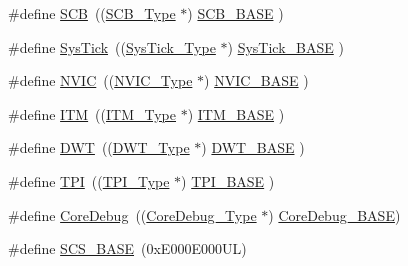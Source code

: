 \begin{DoxyCompactItemize}
\item 
\#define \mbox{\hyperlink{group___c_m_s_i_s__core__base_gaaaf6477c2bde2f00f99e3c2fd1060b01}{S\+CB}}~((\mbox{\hyperlink{struct_s_c_b___type}{S\+C\+B\+\_\+\+Type}}       $\ast$)     \mbox{\hyperlink{group___c_m_s_i_s__core__base_gad55a7ddb8d4b2398b0c1cfec76c0d9fd}{S\+C\+B\+\_\+\+B\+A\+SE}}      )
\item 
\#define \mbox{\hyperlink{group___c_m_s_i_s__core__base_gacd96c53beeaff8f603fcda425eb295de}{Sys\+Tick}}~((\mbox{\hyperlink{struct_sys_tick___type}{Sys\+Tick\+\_\+\+Type}}   $\ast$)     \mbox{\hyperlink{group___c_m_s_i_s__core__base_ga58effaac0b93006b756d33209e814646}{Sys\+Tick\+\_\+\+B\+A\+SE}}  )
\item 
\#define \mbox{\hyperlink{group___c_m_s_i_s__core__base_gac8e97e8ce56ae9f57da1363a937f8a17}{N\+V\+IC}}~((\mbox{\hyperlink{struct_n_v_i_c___type}{N\+V\+I\+C\+\_\+\+Type}}      $\ast$)     \mbox{\hyperlink{group___c_m_s_i_s__core__base_gaa0288691785a5f868238e0468b39523d}{N\+V\+I\+C\+\_\+\+B\+A\+SE}}     )
\item 
\#define \mbox{\hyperlink{group___c_m_s_i_s__core__base_gabae7cdf882def602cb787bb039ff6a43}{I\+TM}}~((\mbox{\hyperlink{struct_i_t_m___type}{I\+T\+M\+\_\+\+Type}}       $\ast$)     \mbox{\hyperlink{group___c_m_s_i_s__core__base_gadd76251e412a195ec0a8f47227a8359e}{I\+T\+M\+\_\+\+B\+A\+SE}}      )
\item 
\#define \mbox{\hyperlink{group___c_m_s_i_s__core__base_gabbe5a060185e1d5afa3f85b14e10a6ce}{D\+WT}}~((\mbox{\hyperlink{struct_d_w_t___type}{D\+W\+T\+\_\+\+Type}}       $\ast$)     \mbox{\hyperlink{group___c_m_s_i_s__core__base_gafdab534f961bf8935eb456cb7700dcd2}{D\+W\+T\+\_\+\+B\+A\+SE}}      )
\item 
\#define \mbox{\hyperlink{group___c_m_s_i_s__core__base_ga8b4dd00016aed25a0ea54e9a9acd1239}{T\+PI}}~((\mbox{\hyperlink{struct_t_p_i___type}{T\+P\+I\+\_\+\+Type}}       $\ast$)     \mbox{\hyperlink{group___c_m_s_i_s__core__base_ga2b1eeff850a7e418844ca847145a1a68}{T\+P\+I\+\_\+\+B\+A\+SE}}      )
\item 
\#define \mbox{\hyperlink{group___c_m_s_i_s__core__base_gab6e30a2b802d9021619dbb0be7f5d63d}{Core\+Debug}}~((\mbox{\hyperlink{struct_core_debug___type}{Core\+Debug\+\_\+\+Type}} $\ast$)     \mbox{\hyperlink{group___c_m_s_i_s__core__base_ga680604dbcda9e9b31a1639fcffe5230b}{Core\+Debug\+\_\+\+B\+A\+SE}})
\item 
\#define \mbox{\hyperlink{group___c_m_s_i_s__core__base_ga3c14ed93192c8d9143322bbf77ebf770}{S\+C\+S\+\_\+\+B\+A\+SE}}~(0x\+E000\+E000\+U\+L)

\end{DoxyCompactItemize}
